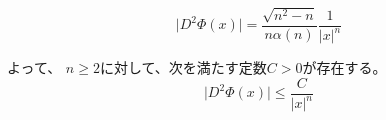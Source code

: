 \documentclass[12pt,b5paper]{ltjsarticle}
\begin{document}
\begin{equation}
 \lvert D^2\Phi(x)\rvert
  =
  \frac{\sqrt{n^2-n}}{n\alpha(n)} \frac{ 1 }{\lvert x \rvert^{n}}
\end{equation}

よって、
$n\geq2$に対して、次を満たす定数$C>0$が存在する。
\begin{equation}
 \lvert D^2\Phi(x)\rvert
  \leq \frac{C}{\lvert x \rvert^{n}}
\end{equation}


\hrulefill
\end{document}
